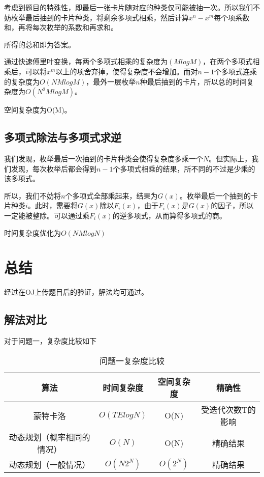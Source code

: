 \documentclass[master]{thesis-uestc}
\begin{document}
考虑到题目的特殊性，即最后一张卡片随对应的种类仅可能被抽一次。所以我们不妨枚举最后抽到的卡片种类，将剩余多项式相乘，然后计算$x^n-x^m$每个项系数和，再将每次枚举的系数和再求和。

所得的总和即为答案。

通过快速傅里叶变换，每两个多项式相乘的复杂度为$(MlogM)$，在两个多项式相乘后，可以将$x^m$以上的项舍弃掉，使得复杂度不会增加。而对$n-1$个多项式连乘的复杂度为$O(NMlogM)$，最外一层枚举$n$种最后抽到的卡片，所以总的时间复杂度为$O(N^2MlogM)$。

空间复杂度为O(M)。

\section{多项式除法与多项式求逆}

我们发现，枚举最后一次抽到的卡片种类会使得复杂度多乘一个$N$。但实际上，我们发现，每次枚举后都会得到$n-1$个多项式相乘的结果，所不同的不过是少乘的该多项式。

所以，我们不妨将$n$个多项式全部乘起来，结果为$G(x)$。枚举最后一个抽到的卡片种类$i$。此时，需要将$G(x)$除以$F_i(x)$，由于$F_i(x)$是$G(x)$的因子，所以一定能被整除。可以通过乘$F_i(x)$的逆多项式，从而算得多项式的商。

时间复杂度优化为$O(NMlogN)$

\chapter{总结}

经过在OJ上传题目后的验证，解法均可通过。

\section{解法对比}

对于问题一，复杂度比较如下


\begin{table}[h]
    \caption{问题一复杂度比较}
    \begin{tabular}{|c|c|c|c|}
    \hline
    算法 & 时间复杂度 & 空间复杂度 & 精确性 \\
    \hline
    蒙特卡洛 & $O(TElogN)$ & O(N) & 受迭代次数T的影响\\
    \hline
    动态规划（概率相同的情况） & $O(N)$ & O(N) & 精确结果 \\
    \hline
    动态规划（一般情况） & $O(N2^N)$ & $O(2^N)$ & 精确结果 \\
    \hline
    \end{tabular}
    \label{tablea}
    \end{table}
\end{document}
